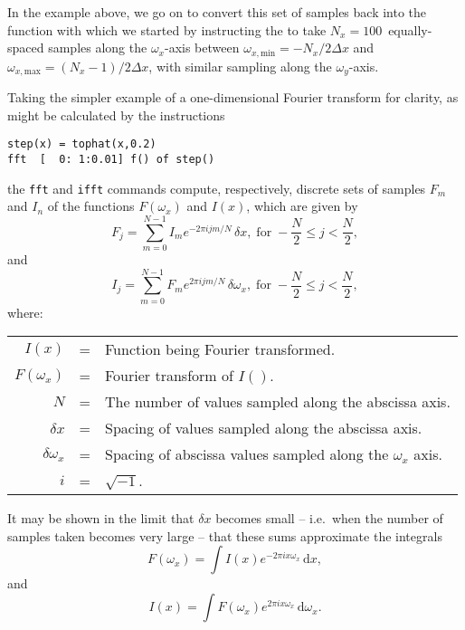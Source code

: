 In the example above, we go on to convert this set of samples back into the
function with which we started by instructing the  to take
$N_x=100$~equally-spaced samples along the $\omega_x$-axis between
$\omega_{x,\mathrm{min}}=-{N_x}/{2\Delta x}$ and
$\omega_{x,\mathrm{max}}=(N_x-1)/{2\Delta x}$, with similar sampling along the
$\omega_y$-axis.

Taking the simpler example of a one-dimensional Fourier transform for clarity,
as might be calculated by the instructions
\begin{verbatim}
step(x) = tophat(x,0.2)
fft  [  0: 1:0.01] f() of step()
\end{verbatim}
the {\tt fft} and {\tt ifft} commands compute,
respectively, discrete sets of samples $F_m$ and $I_n$ of the functions
$F(\omega_x)$ and $I(x)$, which are given by
\begin{displaymath}
F_j = \sum_{m=0}^{N-1} I_m e^{-2\pi ijm/N} \,\delta x,\;\textrm{for}\; -\frac{N}{2}\leq j <\frac{N}{2} ,
\end{displaymath}
\noindent and
\begin{displaymath}
I_j = \sum_{m=0}^{N-1} F_m e^{ 2\pi ijm/N} \,\delta \omega_x,\;\textrm{for}\; -\frac{N}{2}\leq j <\frac{N}{2} ,
\end{displaymath}
\noindent where:
\begin{tabular}{rcp{9cm}}
$I(x)$        & = & Function being Fourier transformed. \\
$F(\omega_x)$ & = & Fourier transform of $I()$. \\
$N$           & = & The number of values sampled along the abscissa axis. \\
$\delta x$    & = & Spacing of values sampled along the abscissa axis. \\
$\delta \omega_x$ & = & Spacing of abscissa values sampled along the $\omega_x$ axis. \\
$i$           & = & $\sqrt{-1}$. \\
\end{tabular}
\vspace{2mm}

It may be shown in the limit that $\delta x$ becomes small -- i.e.\ when the
number of samples taken becomes very large -- that these sums approximate the
integrals
\begin{equation}
F(\omega_x) = \int I(x) e^{-2\pi ix\omega_x} \,\mathrm{d}x ,
\end{equation}
\noindent and
\begin{equation}
I(x) = \int F(\omega_x) e^{ 2\pi ix\omega_x} \,\mathrm{d}\omega_x .
\end{equation}


